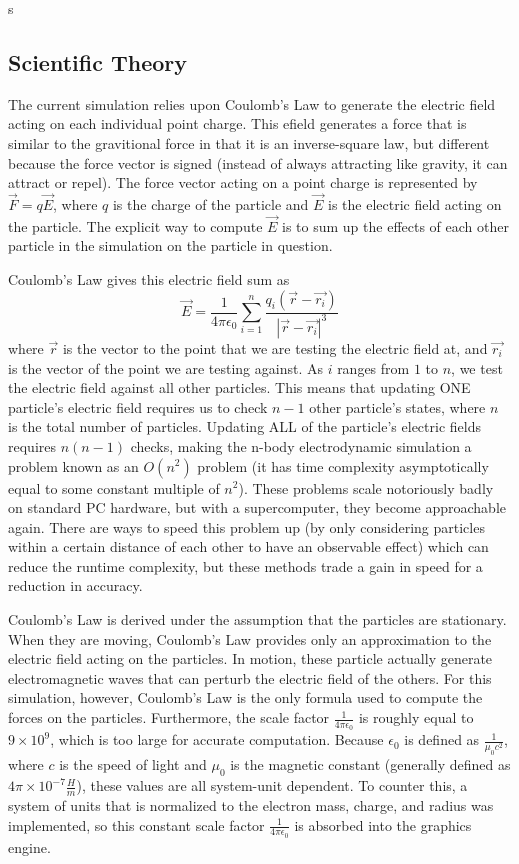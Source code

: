 s\documentclass[10pt]{article}
\begin{document}
\clearpage
\subsection{Scientific Theory}
The current simulation relies upon Coulomb's Law to generate the electric field acting on each individual point charge. This efield generates a force that is similar to the gravitional force in that it is an inverse-square law, but different because the force vector is signed (instead of always attracting like gravity, it can attract or repel). The force vector acting on a point charge is represented by $\vec{F} = q\vec{E}$, where $q$ is the charge of the particle and $\vec{E}$ is the electric field acting on the particle. The explicit way to compute $\vec{E}$ is to sum up the effects of each other particle in the simulation on the particle in question.

Coulomb's Law gives this electric field sum as $$\vec{E} = \frac{1}{4\pi\epsilon_0}\sum_{i = 1}^n \frac{q_i (\vec{r} - \vec{r_i})}{|\vec{r} - \vec{r_i}|^3}$$ where $\vec{r}$ is the vector to the point that we are testing the electric field at, and $\vec{r_i}$ is the vector of the point we are testing against. As $i$ ranges from $1$ to $n$, we test the electric field against all other particles. This means that updating ONE particle's electric field requires us to check $n-1$ other particle's states, where $n$ is the total number of particles. Updating ALL of the particle's electric fields requires $n(n-1)$ checks, making the n-body electrodynamic simulation a problem known as an $O(n^2)$ problem (it has time complexity asymptotically equal to some constant multiple of $n^2$). These problems scale notoriously badly on standard PC hardware, but with a supercomputer, they become approachable again. There are ways to speed this problem up (by only considering particles within a certain distance of each other to have an observable effect) which can reduce the runtime complexity, but these methods trade a gain in speed for a reduction in accuracy.

Coulomb's Law is derived under the assumption that the particles are stationary. When they are moving, Coulomb's Law provides only an approximation to the electric field acting on the particles. In motion, these particle actually generate electromagnetic waves that can perturb the electric field of the others. For this simulation, however, Coulomb's Law is the only formula used to compute the forces on the particles. Furthermore, the scale factor $\frac{1}{4\pi\epsilon_0}$ is roughly equal to $9 \times 10^9$, which is too large for accurate computation. Because $\epsilon_0$ is defined as $\frac{1}{\mu_0 c^2}$, where $c$ is the speed of light and $\mu_0$ is the magnetic constant (generally defined as $4\pi \times 10^{-7} \frac{H}{m}$), these values are all system-unit dependent. To counter this, a system of units that is normalized to the electron mass, charge, and radius was implemented, so this constant scale factor $\frac{1}{4\pi\epsilon_0}$ is absorbed into the graphics engine.
\end{document}
